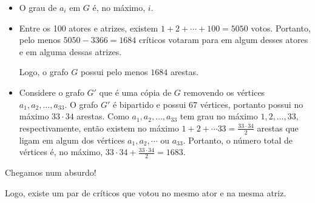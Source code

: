 \documentclass[10pt, a4paper]{article}
\begin{document}
	\begin{itemize}

		\item O grau de $a_i$ em $G$ é, no máximo, $i$.

		\item Entre os 100 atores e atrizes, existem $1 + 2 + \cdots + 100 = 5050$ votos. Portanto, pelo menos $5050 - 3366 = 1684$ críticos votaram para em algum desses atores e em alguma dessas atrizes.

			Logo, o grafo $G$ possui pelo menos $1684$ arestas.

		\item Considere o grafo $G'$ que é uma cópia de $G$ removendo os vértices $a_1, a_2, \dots, a_{33}$. O grafo $G'$ é bipartido e possui $67$ vértices, portanto possui no máximo $33 \cdot 34$ arestas. Como $a_1, a_2, \dots, a_{33}$ tem grau no máximo $1, 2, \dots, 33$, respectivamente, então existem no máximo $1 + 2 + \cdots 33 = \frac{33\cdot34}{2}$ arestas que ligam em algum dos vértices $a_1, a_2, \cdots$ ou $a_{33}$. Portanto, o número total de vértices é, no máximo, $33 \cdot 34 + \frac{33 \cdot 34}{2} = 1683$.
	\end{itemize}

	Chegamos num absurdo!

	Logo, existe um par de críticos que votou no mesmo ator e na mesma atriz.
\end{document}
